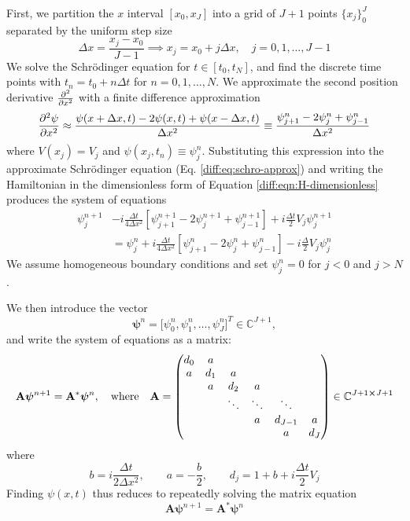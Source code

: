 \documentclass[11pt, a4paper]{article}
\newcommand{\mat}[1]{\mathbf{#1}}
\newcommand{\schro}{Schr\"{o}dinger\xspace}
\begin{document}
First, we partition the $ x $ interval $ [x_{0}, x_{J}] $ into a grid of $ J + 1 $ points $ \{x_{j}\}_{0}^{J} $ separated by the uniform step size
\begin{equation*}
	\Delta x = \frac{x_{j} - x_{0}}{J-1} \implies x_{j} = x_{0} + j\Delta x, \quad j = 0, 1, \ldots, J - 1
\end{equation*}
We solve the \schro equation for $ t \in [t_{0}, t_{N}] $, and find the discrete time points with $ t_{n} = t_{0} + n \Delta t $ for $ n = 0, 1, \ldots, N $. We approximate the second position derivative $ \pdv[2]{}{x} $ with a finite difference approximation
\begin{equation*}
	\pdv[2]{\psi}{x} \approx \frac{\psi(x + \Delta x, t) - 2\psi(x, t) + \psi(x - \Delta x, t)}{\Delta x^{2}} \equiv \frac{\psi_{j+1}^{n} - 2\psi_{j}^{n} + \psi_{j-1}^{n}}{\Delta x^{2}}
\end{equation*}
where $ V(x_{j}) = V_{j} $ and $ \psi(x_{j}, t_{n}) \equiv \psi_{j}^{n} $. Substituting this expression into the approximate \schro equation  (Eq. \ref{diff:eq:schro-approx}) and writing the Hamiltonian in the dimensionless form of Equation \ref{diff:eqn:H-dimensionless} produces the system of equations
\begin{align*}
	\psi_{j}^{n+1} &- i \frac{\Delta t}{4 \Delta x^{2}}\left[\psi_{j+1}^{n+1} - 2\psi_{j}^{n+1} + \psi_{j-1}^{n+1}\right] + i \frac{\Delta t}{2}V_{j}\psi_{j}^{n+1} \\
	&=
	\psi_{j}^{n} + i \frac{\Delta t}{4\Delta x^{2}}\left[\psi_{j+1}^{n} - 2\psi_{j}^{n} + \psi_{j-1}^{n}\right] - i\frac{\Delta}{2}V_{j}\psi_{j}^{n}
\end{align*}
We assume homogeneous boundary conditions and set $ \psi_{j}^{n} = 0 $ for $ j < 0 $ and $ j > N $. 

We then introduce the vector
\begin{equation*}
	\bm{\psi}^{n} = \big[\psi_{0}^{n}, \psi_{1}^{n}, \ldots, \psi_{J}^{n}\big]^{T} \in \mathbb{C}^{J+1},
\end{equation*}
and write the system of equations as a matrix:
\begin{equation*}
	\mat{A}\bm{\psi}^{n+1} = \mat{A}^{*}\bm{\psi}^{n}, \quad \text{where} \quad \mat{A} = 
	\begin{pmatrix}
		d_{0} & a & & & & \\
		a & d_{1} & a & & &\\
		  & a & d_{2} & a & &\\
		  &   &  \ddots & \ddots & \ddots &\\
		  & & & a & d_{J-1} & a\\
		  & & &  & a & d_{J}
	\end{pmatrix}
	\in \mathbb{C}^{J+1 \cross J+1}
\end{equation*}
where
\begin{equation*}
	b = i\frac{\Delta t}{2 \Delta x^{2}}, \qquad a = -\frac{b}{2}, \qquad d_{j} = 1 + b + i\frac{\Delta t}{2}V_{j}
\end{equation*}
Finding $ \psi(x, t) $ thus reduces to repeatedly solving the matrix equation 
\begin{equation*}
	\mat{A}\bm{\psi}^{n+1} = \mat{A}^{*}\bm{\psi}^{n}
\end{equation*}
\end{document}
